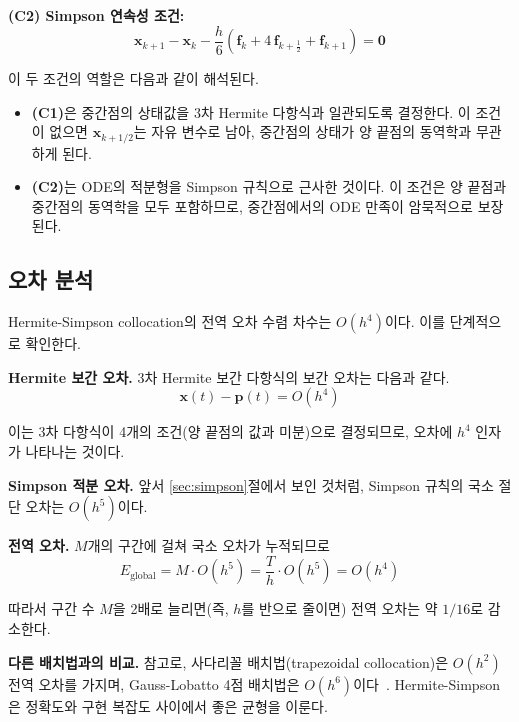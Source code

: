 \documentclass[11pt]{article}
\begin{document}
\textbf{(C2) Simpson 연속성 조건:}
\begin{equation}
\label{eq:C2}
\mathbf{x}_{k+1} - \mathbf{x}_k - \frac{h}{6}\left(\mathbf{f}_k + 4\, \mathbf{f}_{k+\frac{1}{2}} + \mathbf{f}_{k+1}\right) = \mathbf{0}
\end{equation}

이 두 조건의 역할은 다음과 같이 해석된다.
\begin{itemize}
  \item \textbf{(C1)}은 중간점의 상태값을 3차 Hermite 다항식과 일관되도록 결정한다. 이 조건이 없으면 $\mathbf{x}_{k+1/2}$는 자유 변수로 남아, 중간점의 상태가 양 끝점의 동역학과 무관하게 된다.
  \item \textbf{(C2)}는 ODE의 적분형을 Simpson 규칙으로 근사한 것이다. 이 조건은 양 끝점과 중간점의 동역학을 모두 포함하므로, 중간점에서의 ODE 만족이 암묵적으로 보장된다.
\end{itemize}


\subsection{오차 분석}
\label{sec:error}

Hermite-Simpson collocation의 전역 오차 수렴 차수는 $O(h^4)$이다. 이를 단계적으로 확인한다.

\textbf{Hermite 보간 오차.} 3차 Hermite 보간 다항식의 보간 오차는 다음과 같다.
\[
\mathbf{x}(t) - \mathbf{p}(t) = O(h^4)
\]

이는 3차 다항식이 4개의 조건(양 끝점의 값과 미분)으로 결정되므로, 오차에 $h^4$ 인자가 나타나는 것이다.

\textbf{Simpson 적분 오차.} 앞서 \ref{sec:simpson}절에서 보인 것처럼, Simpson 규칙의 국소 절단 오차는 $O(h^5)$이다.

\textbf{전역 오차.} $M$개의 구간에 걸쳐 국소 오차가 누적되므로
\[
E_{\text{global}} = M \cdot O(h^5) = \frac{T}{h} \cdot O(h^5) = O(h^4)
\]

따라서 구간 수 $M$을 2배로 늘리면(즉, $h$를 반으로 줄이면) 전역 오차는 약 $1/16$로 감소한다.

\textbf{다른 배치법과의 비교.} 참고로, 사다리꼴 배치법(trapezoidal collocation)은 $O(h^2)$ 전역 오차를 가지며, Gauss-Lobatto 4점 배치법은 $O(h^6)$이다~\cite{Herman1996}. Hermite-Simpson은 정확도와 구현 복잡도 사이에서 좋은 균형을 이룬다.


\end{document}
